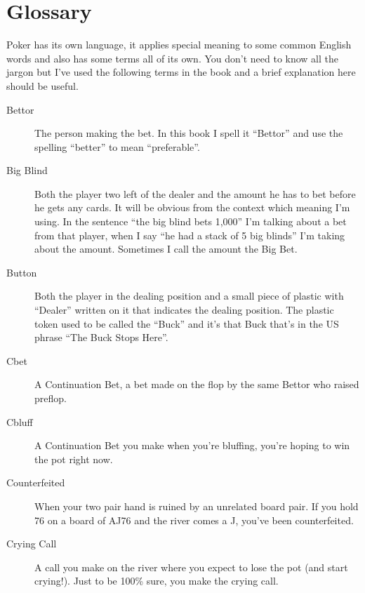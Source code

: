 \chapter{Glossary}



Poker has its own language, it applies special meaning to some
common English words and also has some terms all of its own. You
don't need to know all the jargon but I've used the following terms
in the book and a brief explanation here should be useful.

\begin{description}

\item[Bettor] The person making the bet. In this book I spell it ``Bettor''
and use the spelling ``better'' to mean ``preferable''.

\item[Big Blind] Both the player two left of the dealer and the amount
he has to bet before he gets any cards. It will be obvious from the context which
meaning I'm using. In the sentence ``the big blind bets 1,000'' I'm talking about a bet
from that player, when I say ``he had a stack of 5 big blinds'' I'm taking about the
amount. Sometimes I call the amount the Big Bet.

\item[Button] Both the player in the dealing position and a small piece
of plastic with ``Dealer'' written on it that indicates the dealing position.
The plastic token used to be called the ``Buck'' and it's that Buck that's in the
US phrase ``The Buck Stops Here''.

\item[Cbet] A Continuation Bet, a bet made on the flop by the same Bettor
who raised preflop.

\item[Cbluff] A Continuation Bet you make when you're bluffing, you're hoping
to win the pot right now.

\item[Counterfeited] When your two pair hand is ruined by an unrelated board pair.
If you hold 76 on a board of AJ76 and the river comes a J,
you've been counterfeited.

\item[Crying Call] A call you make on the river where you expect to lose the pot
(and start crying!). Just to be 100\% sure, you make the crying call.


\end{description}
